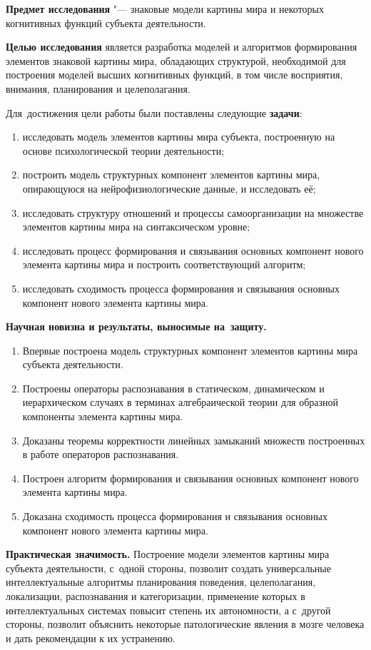 \textbf{Предмет исследования} "--- знаковые модели картины мира и некоторых когнитивных функций субъекта деятельности.

\textbf{Целью исследования} является разработка моделей и алгоритмов формирования элементов знаковой картины мира, обладающих структурой, необходимой для построения моделей высших когнитивных функций, в том числе восприятия, внимания, планирования и целеполагания.

Для~достижения цели работы были поставлены следующие \textbf{задачи}:
\begin{enumerate}
	\item исследовать модель элементов картины мира субъекта, построенную на основе психологической теории деятельности;
	\item построить модель структурных компонент элементов картины мира, опирающуюся на нейрофизиологические данные, и исследовать её;
	\item исследовать структуру отношений и процессы самоорганизации на множестве элементов картины мира на синтаксическом уровне;
	\item исследовать процесс формирования и связывания основных компонент нового элемента картины мира и построить соответствующий алгоритм;
	\item исследовать сходимость процесса формирования и связывания основных компонент нового элемента картины мира.
\end{enumerate}

\textbf{Научная новизна и результаты, выносимые на~защиту.}
\begin{enumerate}
	\renewcommand\labelenumi{\theenumi.}
	\item Впервые построена модель структурных компонент элементов картины мира субъекта деятельности.
	\item Построены операторы распознавания в статическом, динамическом и иерархическом случаях в терминах алгебраической теории для образной компоненты элемента картины мира.
	\item Доказаны теоремы корректности линейных замыканий множеств построенных в работе операторов распознавания.
	\item Построен алгоритм формирования и связывания основных компонент нового элемента картины мира.
	\item Доказана сходимость процесса формирования и связывания основных компонент нового элемента картины мира.
\end{enumerate}

\textbf{Практическая значимость.} Построение модели элементов картины мира субъекта деятельности, с~одной стороны, позволит создать универсальные интеллектуальные алгоритмы планирования поведения, целеполагания, локализации, распознавания и категоризации, применение которых в интеллектуальных системах повысит степень их автономности, а с~другой стороны, позволит объяснить некоторые патологические явления в мозге человека и дать рекомендации к их устранению.


